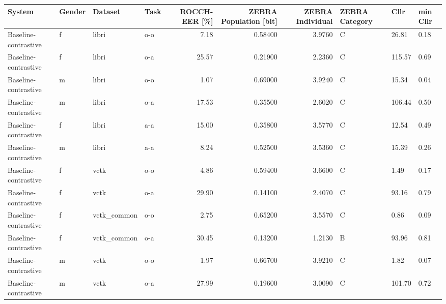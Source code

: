 \begin{tabular}{llllrrrlll}
\toprule
               System & Gender &      Dataset & Task &  ROCCH-EER [\%] &  ZEBRA Population [bit] &  ZEBRA Individual & ZEBRA Category &    Cllr & min Cllr \\
\midrule
 Baseline-contrastive &      f &        libri &  o-o &           7.18 &                 0.58400 &            3.9760 &              C &   26.81 &     0.18 \\
 Baseline-contrastive &      f &        libri &  o-a &          25.57 &                 0.21900 &            2.2360 &              C &  115.57 &     0.69 \\
 Baseline-contrastive &      m &        libri &  o-o &           1.07 &                 0.69000 &            3.9240 &              C &   15.34 &     0.04 \\
 Baseline-contrastive &      m &        libri &  o-a &          17.53 &                 0.35500 &            2.6020 &              C &  106.44 &     0.50 \\
 Baseline-contrastive &      f &        libri &  a-a &          15.00 &                 0.35800 &            3.5770 &              C &   12.54 &     0.49 \\
 Baseline-contrastive &      m &        libri &  a-a &           8.24 &                 0.52500 &            3.5360 &              C &   15.39 &     0.26 \\
 Baseline-contrastive &      f &         vctk &  o-o &           4.86 &                 0.59400 &            3.6600 &              C &    1.49 &     0.17 \\
 Baseline-contrastive &      f &         vctk &  o-a &          29.90 &                 0.14100 &            2.4070 &              C &   93.16 &     0.79 \\
 Baseline-contrastive &      f &  vctk\_common &  o-o &           2.75 &                 0.65200 &            3.5570 &              C &    0.86 &     0.09 \\
 Baseline-contrastive &      f &  vctk\_common &  o-a &          30.45 &                 0.13200 &            1.2130 &              B &   93.96 &     0.81 \\
 Baseline-contrastive &      m &         vctk &  o-o &           1.97 &                 0.66700 &            3.9210 &              C &    1.82 &     0.07 \\
 Baseline-contrastive &      m &         vctk &  o-a &          27.99 &                 0.19600 &            3.0090 &              C &  101.70 &     0.72 \\

\end{tabular}

